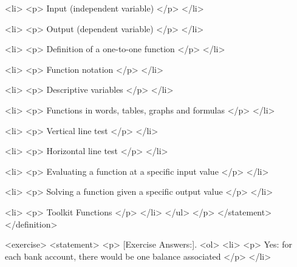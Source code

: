                         <li>
                            <p>
                                Input (independent variable)
                            </p>
                        </li>

                        <li>
                            <p>
                                Output (dependent variable)
                            </p>
                        </li>

                        <li>
                            <p>
                                Definition of a one-to-one function
                            </p>
                        </li>

                        <li>
                            <p>
                                Function notation
                            </p>
                        </li>

                        <li>
                            <p>
                                Descriptive variables
                            </p>
                        </li>

                        <li>
                            <p>
                                Functions in words, tables, graphs and formulas
                            </p>
                        </li>

                        <li>
                            <p>
                                Vertical line test
                            </p>
                        </li>

                        <li>
                            <p>
                                Horizontal line test
                            </p>
                        </li>

                        <li>
                            <p>
                                Evaluating a function at a specific input value
                            </p>
                        </li>

                        <li>
                            <p>
                                Solving a function given a specific output value
                            </p>
                        </li>

                        <li>
                            <p>
                                Toolkit Functions
                            </p>
                        </li>
                    </ul>
                </p>
            </statement>
        </definition>

        <exercise>
            <statement>
                <p>
                    [Exercise Answers:].
                    <ol>
                        <li>
                            <p>
                                Yes: for each bank account, there would be one balance associated
                            </p>
                        </li>

